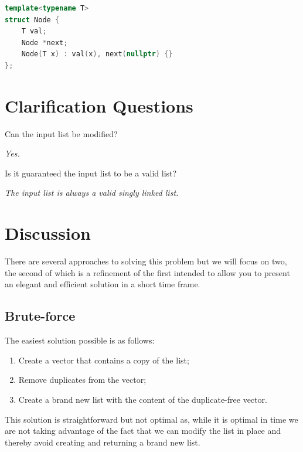 \begin{lstlisting}[language=c++, caption=Singly Linked list definition,label=list:delete_duplicates_list:linked_list]
template<typename T>
struct Node {
	T val;
	Node *next;
	Node(T x) : val(x), next(nullptr) {}
};
\end{lstlisting}

\section{Clarification Questions}

\begin{QandA}
	\item \begin{questionitem} \begin{question} Can the input list be modified?  \end{question} 	 
    \begin{answered}
		\textit{Yes.}
	\end{answered} \end{questionitem}

	\item \begin{questionitem} \begin{question} Is it guaranteed the input list to be a valid list?  \end{question} 	 
		\begin{answered}
			\textit{The input list is always a valid singly linked list.}
		\end{answered} \end{questionitem}
	
\end{QandA}

\section{Discussion}
\label{delete_duplicates_list:sec:discussion}
There are several approaches to solving this problem but we will focus on two, the second of which is a refinement of the first intended to allow you to present an elegant and efficient solution in a short time frame.

\subsection{Brute-force}
\label{delete_duplicates_list:sec:bruteforce}
The easiest solution possible is as follows:
\begin{enumerate}
	\item Create a vector that contains a copy of the list;
	\item Remove duplicates from the vector;
	\item Create a brand new list with the content of the duplicate-free vector.
\end{enumerate}
This solution is straightforward but not optimal as, while it is optimal in time we are not taking advantage of the fact that we can modify the list in place and thereby avoid creating and returning a brand new list.  

